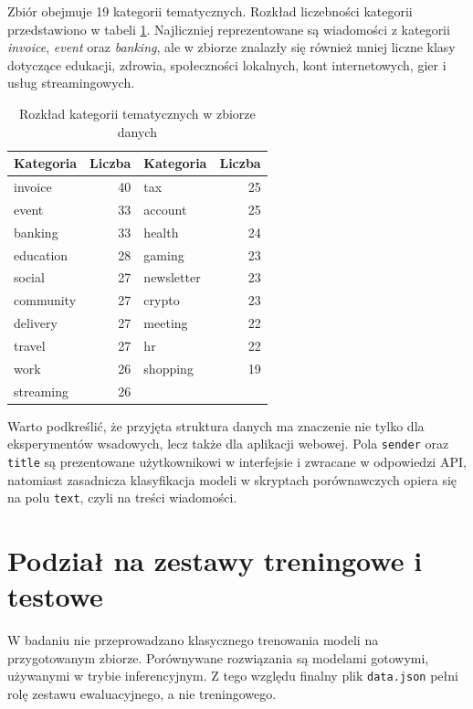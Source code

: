 \documentclass[12pt,a4paper,openright]{report}
\begin{document}
Zbiór obejmuje 19 kategorii tematycznych. Rozkład liczebności kategorii przedstawiono w tabeli \ref{tab:category-distribution}. Najliczniej reprezentowane są wiadomości z kategorii \textit{invoice}, \textit{event} oraz \textit{banking}, ale w zbiorze znalazły się również mniej liczne klasy dotyczące edukacji, zdrowia, społeczności lokalnych, kont internetowych, gier i usług streamingowych.

\begin{table}[H]
    \centering
    \small
    \begin{tabular}{l r l r}
        \toprule
        Kategoria & Liczba & Kategoria & Liczba \\
        \midrule
        invoice & 40 & tax & 25 \\
        event & 33 & account & 25 \\
        banking & 33 & health & 24 \\
        education & 28 & gaming & 23 \\
        social & 27 & newsletter & 23 \\
        community & 27 & crypto & 23 \\
        delivery & 27 & meeting & 22 \\
        travel & 27 & hr & 22 \\
        work & 26 & shopping & 19 \\
        streaming & 26 &  &  \\
        \bottomrule
    \end{tabular}
    \caption{Rozkład kategorii tematycznych w zbiorze danych}
    \label{tab:category-distribution}
\end{table}

Warto podkreślić, że przyjęta struktura danych ma znaczenie nie tylko dla eksperymentów wsadowych, lecz także dla aplikacji webowej. Pola \texttt{sender} oraz \texttt{title} są prezentowane użytkownikowi w interfejsie i zwracane w odpowiedzi API, natomiast zasadnicza klasyfikacja modeli w skryptach porównawczych opiera się na polu \texttt{text}, czyli na treści wiadomości.

\section{Podział na zestawy treningowe i testowe}

W badaniu nie przeprowadzano klasycznego trenowania modeli na przygotowanym zbiorze. Porównywane rozwiązania są modelami gotowymi, używanymi w trybie inferencyjnym. Z tego względu finalny plik \texttt{data.json} pełni rolę zestawu ewaluacyjnego, a nie treningowego.
\end{document}
